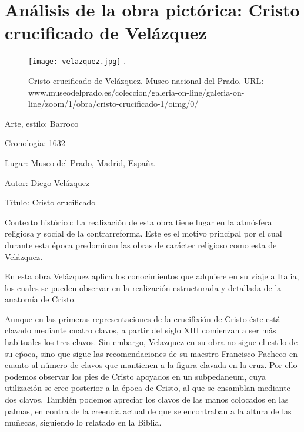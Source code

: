 \section{Análisis de la obra pictórica: Cristo crucificado de Velázquez } 

\begin{figure}[ht!]
    \centering
    \texttt{[image: velazquez.jpg]}
   .\caption{Cristo crucificado de Velázquez. Museo nacional del Prado. URL: www.museodelprado.es/coleccion/galeria-on-line/galeria-on-line/zoom/1/obra/cristo-crucificado-1/oimg/0/}
\end{figure}

\newpage

Arte, estilo: Barroco

Cronología: 1632

Lugar: Museo del Prado, Madrid, España

Autor: Diego Velázquez

Título: Cristo crucificado


Contexto histórico: La realización de esta obra tiene lugar en la atmósfera religiosa y social de la contrarreforma. Este es el motivo principal por el cual durante esta época predominan las obras de carácter religioso como esta de Velázquez.

En esta obra Velázquez aplica los conocimientos que adquiere en su viaje a Italia, los cuales se pueden observar en la realización estructurada y detallada de la anatomía de Cristo.

Aunque en las primeras representaciones de la crucifixión de Cristo éste está clavado mediante cuatro clavos, a partir del siglo XIII comienzan a ser más habituales los tres clavos. Sin embargo, Velazquez en su obra no sigue el estilo de su eṕoca, sino que sigue las recomendaciones de su maestro Francisco Pacheco en cuanto al número de clavos que mantienen a la figura clavada en la cruz. Por ello podemos observar los pies de Cristo apoyados en un subpedaneum, cuya utilización se cree posterior a la época de Cristo, al que se ensamblan mediante dos clavos. También podemos apreciar los clavos de las manos colocados en las palmas, en contra de la creencia actual de que se encontraban a la altura de las muñecas, siguiendo lo relatado en la Biblia.

